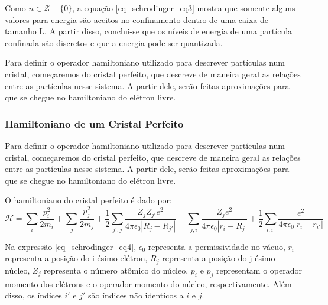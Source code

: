     \par Como $n \in \mathcal{Z} - \{0\}$, a equação \eqref{eq_schrodinger_eq3} mostra que somente alguns valores para energia são aceitos no confinamento dentro de uma caixa de tamanho L. A partir disso, conclui-se que os níveis de energia de uma partícula confinada são discretos e que a energia pode ser quantizada\cite{frustrado2}.

    \par Para definir o operador hamiltoniano utilizado para descrever partículas num cristal, começaremos do cristal perfeito, que descreve de maneira geral as relações entre as partículas nesse sistema. A partir dele, serão feitas aproximações para que se chegue no hamiltoniano do elétron livre\cite{qm_fis2}.

    \subsubsection{Hamiltoniano de um Cristal Perfeito}

      \par Para definir o operador hamiltoniano utilizado para descrever partículas num cristal, começaremos do cristal perfeito, que descreve de maneira geral as relações entre as partículas nesse sistema. A partir dele, serão feitas aproximações para que se chegue no hamiltoniano do elétron livre\cite{qm_fis2}. 
    
      \par O hamiltoniano do cristal perfeito\cite{frustrado3} é dado por:
      \begin{equation}\label{eq_schrodinger_eq4}
        \mathcal{H} = 
          \sum_{i} \frac{p_{i}^2}{2m_{i}} 
          + \sum_{j} \frac{p_{j}^2}{2m_{j}} 
          + \frac{1}{2} \sum_{j', j} \frac{Z_{j} Z_{j'} e^2}{4\pi\epsilon_{0}\left|R_{j} - R_{j'}\right|}-  \sum_{j, i} \frac{Z_{j} e^2}{4\pi\epsilon_{0}\left|r_{i} - R_{j}\right|} 
          + \frac{1}{2} \sum_{i, i'} \frac{e^2}{4\pi\epsilon_{0}\left|r_{i} - r_{i'}\right|}
      \end{equation}

      \par Na expressão \eqref{eq_schrodinger_eq4}, $\epsilon_{0}$ representa a permissividade no vácuo, $r_{i}$ representa a posição do i-ésimo elétron, $R_{j}$ representa a posição do j-ésimo núcleo, $Z_{j}$ representa o número atômico do núcleo, $p_{i}$ e $p_{j}$ representam o operador momento dos elétrons e o operador momento do núcleo, respectivamente. Além disso, os índices $i'$ e $j'$ são índices não identicos a $i$ e $j$.

